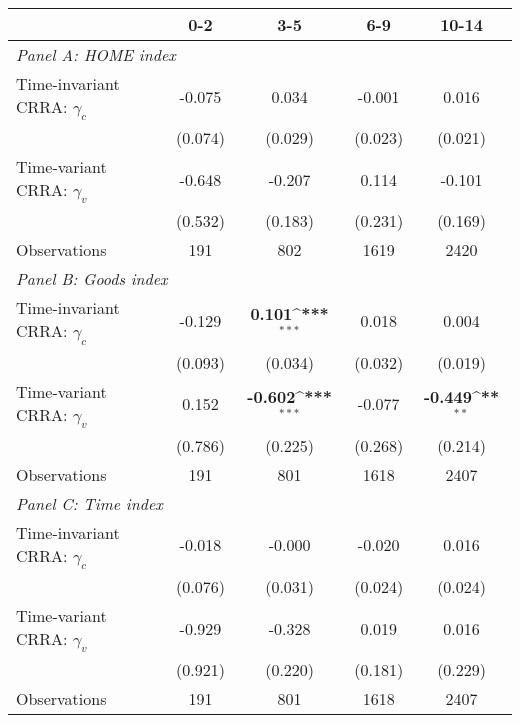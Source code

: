 {
\def\sym#1{\ifmmode^{#1}\else\(^{#1}\)\fi}
\begin{tabular}{l*{4}{c}}
\toprule
                &0-2&3-5&6-9&10-14\\
\midrule
\multicolumn{5}{l}{\textit{Panel A: HOME index}} \\
Time-invariant CRRA: $\gamma_c$&   -0.075         &    0.034         &   -0.001         &    0.016         \\
                &  (0.074)         &  (0.029)         &  (0.023)         &  (0.021)         \\

Time-variant CRRA: $\gamma_v$&   -0.648         &   -0.207         &    0.114         &   -0.101         \\
                &  (0.532)         &  (0.183)         &  (0.231)         &  (0.169)         \\
\midrule
Observations    &      191         &      802         &     1619         &     2420         \\



\midrule
\multicolumn{5}{l}{\textit{Panel B: Goods index}} \\
Time-invariant CRRA: $\gamma_c$&   -0.129         &    \textbf{0.101\sym{***}}&    0.018         &    0.004         \\
                &  (0.093)         &  (0.034)         &  (0.032)         &  (0.019)         \\

Time-variant CRRA: $\gamma_v$&    0.152         &   \textbf{-0.602\sym{***}}&   -0.077         &   \textbf{-0.449\sym{**}} \\
                &  (0.786)         &  (0.225)         &  (0.268)         &  (0.214)         \\
\midrule
Observations    &      191         &      801         &     1618         &     2407         \\




\midrule
\multicolumn{5}{l}{\textit{Panel C: Time index}} \\
Time-invariant CRRA: $\gamma_c$&   -0.018         &   -0.000         &   -0.020         &    0.016         \\
                &  (0.076)         &  (0.031)         &  (0.024)         &  (0.024)         \\
Time-variant CRRA: $\gamma_v$&   -0.929         &   -0.328         &    0.019         &    0.016         \\
                &  (0.921)         &  (0.220)         &  (0.181)         &  (0.229)         \\
\midrule
Observations    &      191         &      801         &     1618         &     2407         \\





\end{tabular}}
